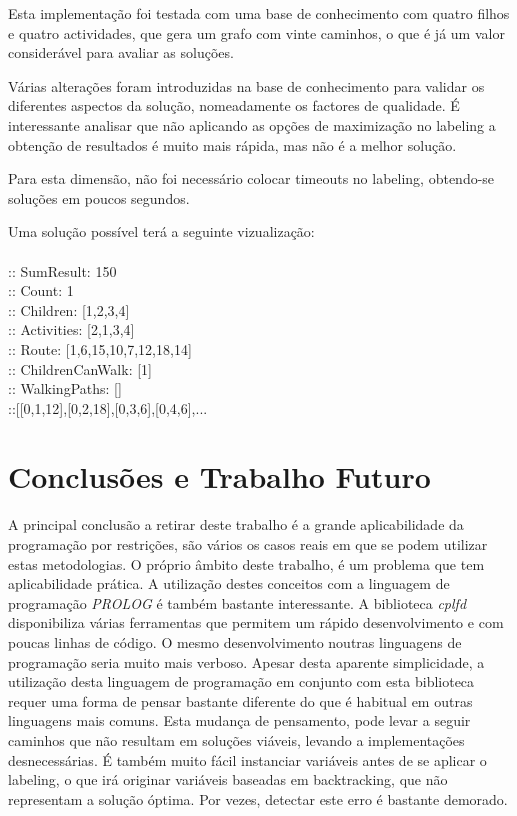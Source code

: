 \documentclass[runningheads]{llncs}
\begin{document}
Esta implementação foi testada com uma base de conhecimento com quatro filhos e quatro actividades, que gera um grafo com vinte caminhos, o que é já um valor considerável para avaliar as soluções.

Várias alterações foram introduzidas na base de conhecimento para validar os diferentes aspectos da solução, nomeadamente os factores de qualidade. É interessante analisar que não aplicando as opções de maximização no labeling a obtenção de resultados é muito mais rápida, mas não é a melhor solução.

Para esta dimensão, não foi necessário colocar timeouts no labeling, obtendo-se soluções em poucos segundos.

Uma solução possível terá a seguinte vizualização:
\\\\
:: SumResult: 150\\
:: Count: 1\\
:: Children: [1,2,3,4]\\
:: Activities: [2,1,3,4]\\
:: Route: [1,6,15,10,7,12,18,14]\\
:: ChildrenCanWalk: [1]\\
:: WalkingPaths: []\\
::[[0,1,12],[0,2,18],[0,3,6],[0,4,6],...\\

\section{Conclusões e Trabalho Futuro}\label{conclusoes}

A principal conclusão a retirar deste trabalho é a grande aplicabilidade da programação por restrições, são vários os casos reais em que se podem utilizar estas metodologias. O próprio âmbito deste trabalho, é um problema que tem aplicabilidade prática. A utilização destes conceitos com a linguagem de programação \textit{PROLOG} é também bastante interessante. A biblioteca \textit{cplfd} disponibiliza várias ferramentas que permitem um rápido desenvolvimento e com poucas linhas de código. O mesmo desenvolvimento noutras linguagens de programação seria muito mais verboso. Apesar desta aparente simplicidade, a utilização desta linguagem de programação em conjunto com esta biblioteca requer uma forma de pensar bastante diferente do que é habitual em outras linguagens mais comuns. Esta mudança de pensamento, pode levar a seguir caminhos que não resultam em soluções viáveis, levando a implementações desnecessárias. É também muito fácil instanciar variáveis antes de se aplicar o labeling, o que irá originar variáveis baseadas em backtracking, que não representam a solução óptima. Por vezes, detectar este erro é bastante demorado.
\end{document}
